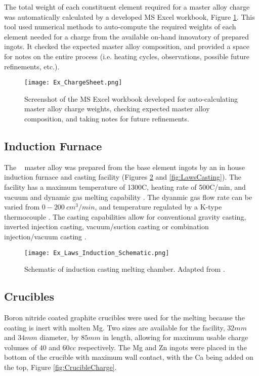 \documentclass[a4paper,12pt,oneside]{report}%
\begin{document}
The total weight of each constituent element required for a master alloy charge was automatically calculated by a developed MS Excel workbook, Figure \ref{fig:ChargeSheet}. This tool used numerical methods to auto-compute the required weights of each element needed for a charge from the available on-hand innovatory of prepared ingots. It checked the expected master alloy composition, and provided a space for notes on the entire process (i.e. heating cycles, observations, possible future refinements, etc.).

\begin{figure}[htbp]
	\centering
	\texttt{[image: Ex\_ChargeSheet.png]}
	\caption{Screenshot of the MS Excel workbook developed for auto-calculating master alloy charge weights, checking expected master alloy composition, and taking notes for future refinements.}
	\label{fig:ChargeSheet}
\end{figure}

\subsection{Induction Furnace}

The \MgZnCa~ master alloy was prepared from the base element ingots by an in house induction furnace and casting facility (Figures \ref{fig:CastingSchematic} and \ref{fig:LawsCasting}). The facility has a maximum temperature of 1300\degree C, heating rate of 500\degree C/min, and vacuum and dynamic gas melting capability \cite{Laws2007}. The dyanmic gas flow rate can be varied from $0-200~ cm^{3}/min$, and temperature regulated by a K-type thermocouple \cite{Laws2007}. The casting capabilities allow for conventional gravity casting, inverted injection casting, vacuum/suction casting or combination injection/vacuum casting \cite{Laws2007}.

\begin{figure}[htbp]
	\centering
	\texttt{[image: Ex\_Laws\_Induction\_Schematic.png]}
	\caption[Schematic of induction casting melting chamber.]{Schematic of induction casting melting chamber. Adapted from \cite{Laws2007}.}
	\label{fig:CastingSchematic}
\end{figure}

\subsection{Crucibles}

Boron nitride coated graphite crucibles were used for the melting because the coating is inert with molten Mg. Two sizes are available for the facility, $32 mm$ and $34 mm$ diameter, by $85 mm$ in length, allowing for maximum usable charge volumes of $40$ and $60 cc$ respectively. The Mg and Zn ingots were placed in the bottom of the crucible with maximum wall contact, with the Ca being added on the top, Figure \ref{fig:CrucibleCharge}.
\end{document}
